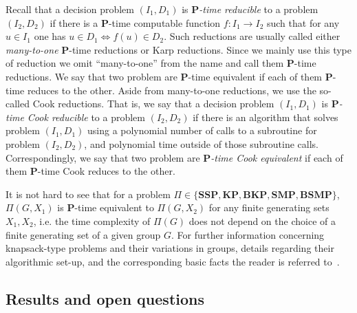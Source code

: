 \documentclass[10pt]{amsart}
\theoremstyle{definition}
\def\P{{\mathbf{P}}}
\def\SSP{{\mathbf{SSP}}}
\def\SMP{{\mathbf{SMP}}}
\def\BSMP{{\mathbf{BSMP}}}
\def\BKP{{\mathbf{BKP}}}
\def\KP{{\mathbf{KP}}}
\begin{document}

\medskip
Recall that a decision problem $(I_1,D_1)$ is  {\em $\P$-time  reducible}
to  a problem $(I_2,D_2)$ if there is a $\P$-time computable function
$f:I_1  \to I_2$  such that for any $u \in I_1$ one has $u \in D_1 \Longleftrightarrow f(u) \in D_2$.
Such reductions are usually called either {\em many-to-one} $\P$-time reductions or Karp reductions.
Since we mainly use this type of reduction we omit ``many-to-one'' from the name and call them $\P$-time reductions. We say that two problem are $\P$-time equivalent if each of them $\P$-time reduces to the other. Aside from many-to-one reductions, we use the so-called Cook reductions. That is, we say that a decision problem $(I_1,D_1)$ is  {\em $\P$-time Cook  reducible} to  a problem $(I_2,D_2)$ if there is an algorithm that solves problem $(I_1,D_1)$ using a polynomial number of calls to a subroutine for problem $(I_2,D_2)$, and polynomial time outside of those subroutine calls. Correspondingly, we say that two problem are {\em $\P$-time Cook equivalent} if each of them $\P$-time Cook reduces to the other.

It is not hard to see that for a problem $\Pi\in \{\SSP, \KP, \BKP, \SMP, \BSMP\}$, $\Pi(G,X_1)$ is $\P$-time equivalent to $\Pi(G,X_2)$ for any finite generating sets $X_1,X_2$, i.e. the time complexity of $\Pi(G)$ does not depend on the choice of a finite generating set of a given group $G$.
For further information concerning knapsack-type problems and their variations in groups, details regarding their algorithmic set-up, and the corresponding basic facts the reader is referred to~\cite{Miasnikov-Nikolaev-Ushakov:2014a}.


\subsection{Results and open questions}\label{sub:results}
\end{document}
